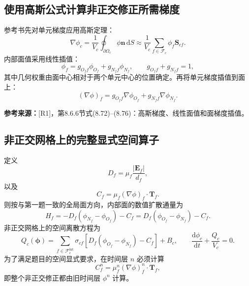 \documentclass[UTF8,12pt,a4paper]{ctexart}
\numberwithin{equation}{section}
\newcommand{\Rone}{\textnormal{[R1]}}
\newcommand{\source}[1]{%
  \par\smallskip
  \noindent\colorbox{sourcebg}{%
    \parbox{0.955\linewidth}{\raggedright\footnotesize\color{sourcegray}\textbf{参考来源：}#1}%
  }
  \par\smallskip
}
\newcommand{\dd}{\,\mathrm d}
\newcommand{\Sf}{\bm S}
\newcommand{\Ef}{\bm E}
\newcommand{\Tf}{\bm T}
\begin{document}
\subsection{使用高斯公式计算非正交修正所需梯度}

参考书先对单元梯度应用高斯定理：
\begin{equation}
  \nabla\phi_c
  =\frac{1}{V_c}
   \oint_{\partial\Omega_c}\phi\bm n\dd S
  \approx
  \boxed{
  \frac{1}{V_c}
  \sum_{f\in\mathcal F_c}\phi_f\Sf_{cf}}.
  \label{eq:gauss_cell_gradient}
\end{equation}
内部面值采用线性插值：
\begin{equation}
  \phi_f=g_{O_f f}\phi_{O_f}+g_{N_f f}\phi_{N_f},
  \qquad g_{O_f f}+g_{N_f f}=1,
  \label{eq:linear_face_value}
\end{equation}
其中几何权重由面中心相对于两个单元中心的位置确定。再将单元梯度插值到面上：
\begin{equation}
  \boxed{
  (\nabla\phi)_f
  =g_{O_f f}\nabla\phi_{O_f}
  +g_{N_f f}\nabla\phi_{N_f}}.
  \label{eq:face_gradient_interpolation}
\end{equation}

\source{\Rone，第8.6.6节式(8.72)--(8.76)：高斯梯度、线性面值和面梯度插值。}

\subsection{非正交网格上的完整显式空间算子}

定义
\begin{equation}
  D_f=\mu_f\frac{|\Ef_f|}{d_f},
  \label{eq:D_nonorth}
\end{equation}
以及
\begin{equation}
  C_f=\mu_f(\nabla\phi)_f\cdot\Tf_f.
  \label{eq:cross_diffusion}
\end{equation}
则按与第一题一致的全局面方向，内部面的数值扩散通量为
\begin{equation}
  \boxed{
  H_f
  =-D_f(\phi_{N_f}-\phi_{O_f})-C_f
  =D_f(\phi_{O_f}-\phi_{N_f})-C_f}.
  \label{eq:full_nonorth_flux}
\end{equation}
非正交网格上的空间离散方程为
\begin{equation}
  \boxed{
  Q_c(\bm\phi)
  =\sum_{f\in\mathcal F_c^{\mathrm{int}}}\sigma_{cf}
  \left[D_f(\phi_{O_f}-\phi_{N_f})-C_f\right]+B_c,
  \qquad
  \frac{\mathrm d\phi_c}{\mathrm dt}+\frac{Q_c}{V_c}=0}.
  \label{eq:nonorth_semidiscrete}
\end{equation}
为了满足题目的空间显式要求，在时间层 $n$ 必须计算
\begin{equation}
  C_f^n=\mu_f^n(\nabla\phi)_f^n\cdot\Tf_f,
  \label{eq:explicit_correction}
\end{equation}
即整个非正交修正都由旧时间层 $\phi^n$ 计算。
\end{document}
